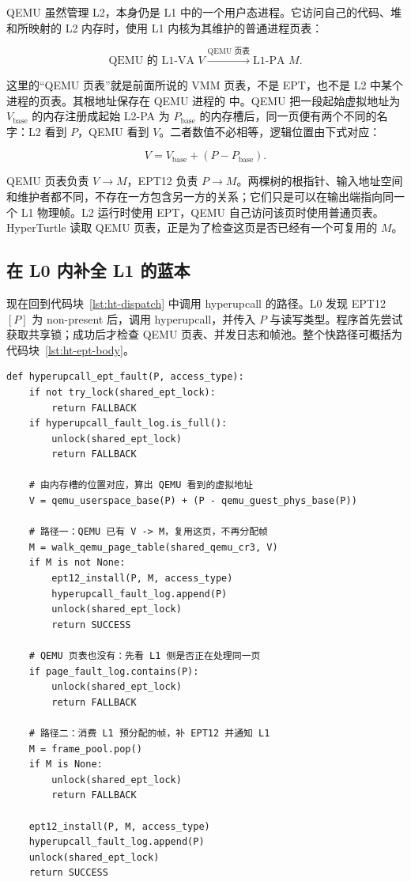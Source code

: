 QEMU 虽然管理 L2，本身仍是 L1 中的一个用户态进程。它访问自己的代码、堆和所映射的 L2 内存时，使用 L1 内核为其维护的普通进程页表：

\begin{equation}
\text{QEMU 的 L1-VA }V
\xrightarrow{\text{QEMU 页表}}\text{L1-PA }M.
\end{equation}

这里的“QEMU 页表”就是前面所说的 VMM 页表，不是 EPT，也不是 L2 中某个进程的页表。其根地址保存在 QEMU 进程的  中。QEMU 把一段起始虚拟地址为 $V_{\text{base}}$ 的内存注册成起始 L2-PA 为 $P_{\text{base}}$ 的内存槽后，同一页便有两个不同的名字：L2 看到 $P$，QEMU 看到 $V$。二者数值不必相等，逻辑位置由下式对应：

\begin{equation}
V=V_{\text{base}}+(P-P_{\text{base}}).
\end{equation}

QEMU 页表负责 $V\rightarrow M$，EPT12 负责 $P\rightarrow M$。两棵树的根指针、输入地址空间和维护者都不同，不存在一方包含另一方的关系；它们只是可以在输出端指向同一个 L1 物理帧。L2 运行时使用 EPT，QEMU 自己访问该页时使用普通页表。HyperTurtle 读取 QEMU 页表，正是为了检查这页是否已经有一个可复用的 $M$。

\subsection{在 L0 内补全 L1 的蓝本}\label{sec:ht-upcall-body}

现在回到代码块~\ref{lst:ht-dispatch} 中调用 hyperupcall 的路径。L0 发现 EPT12$[P]$ 为 non-present 后，调用 hyperupcall，并传入 $P$ 与读写类型。程序首先尝试获取共享锁；成功后才检查 QEMU 页表、并发日志和帧池。整个快路径可概括为代码块~\ref{lst:ht-ept-body}。

\begin{lstlisting}[style=pseudopy,caption={hyperupcall 为缺失的蓝本寻找 L1 物理帧（逻辑伪代码）},label={lst:ht-ept-body}]
def hyperupcall_ept_fault(P, access_type):
    if not try_lock(shared_ept_lock):
        return FALLBACK
    if hyperupcall_fault_log.is_full():
        unlock(shared_ept_lock)
        return FALLBACK

    # 由内存槽的位置对应，算出 QEMU 看到的虚拟地址
    V = qemu_userspace_base(P) + (P - qemu_guest_phys_base(P))

    # 路径一：QEMU 已有 V -> M，复用这页，不再分配帧
    M = walk_qemu_page_table(shared_qemu_cr3, V)
    if M is not None:
        ept12_install(P, M, access_type)
        hyperupcall_fault_log.append(P)
        unlock(shared_ept_lock)
        return SUCCESS

    # QEMU 页表也没有：先看 L1 侧是否正在处理同一页
    if page_fault_log.contains(P):
        unlock(shared_ept_lock)
        return FALLBACK

    # 路径二：消费 L1 预分配的帧，补 EPT12 并通知 L1
    M = frame_pool.pop()
    if M is None:
        unlock(shared_ept_lock)
        return FALLBACK

    ept12_install(P, M, access_type)
    hyperupcall_fault_log.append(P)
    unlock(shared_ept_lock)
    return SUCCESS
\end{lstlisting}

